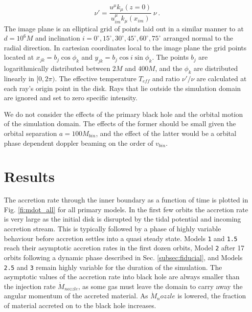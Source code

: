 \documentclass{emulateapj}
\newcommand{\model}[1]{{Model \texttt{#1}}}
\begin{document}
\begin{equation}
	\nu' = \frac{u^\mu k_\mu(z=0)}{u^\mu_{im} k_\mu(x_{im})} \ \nu \ .
\end{equation}
The image plane is an elliptical grid of points laid out in a similar manner to \cite{Kulkarni11} at $d=10^6M$ and inclination $i = 0^\circ, 15^\circ, 30^\circ, 45^\circ, 60^\circ, 75^\circ$ arranged normal to the radial direction.  In cartesian coordinates local to the image plane the grid points located at $x_{jk} = b_j \cos \phi_k$ and $y_{jk} = b_j \cos i \sin \phi_k$.  The points $b_j$ are logarithmically distributed between $2M$ and $400M$, and the  $\phi_k$ are distributed linearly in $[0, 2\pi)$. The effective temperature $T_{eff}$ and ratio $\nu' / \nu$ are calculated at each ray's origin point in the disk.  Rays that lie outside the simulation domain are ignored and set to zero specific intensity.

We do not consider the effects of the primary black hole and the orbital motion of the simulation domain.  The effects of the former should be small given the orbital separation $a = 100M_{bin}$, and the effect of the latter would be a orbital phase dependent doppler beaming on the order of $v_{bin}$.



\section{Results}
\label{sec:results}

The accretion rate through the inner boundary as a function of time is plotted in Fig. \ref{fi:mdot_all} for all primary models.  In the first few orbits the accretion rate is very large as the initial disk is disrupted by the tidal potential and incoming accretion stream.  This is typically followed by a phase of highly variable behaviour before accretion settles into a quasi steady state.  Models \texttt{1} and \texttt{1.5} reach their asymptotic accretion rates in the first dozen orbits, \model{2} after 17 orbits following a dynamic phase described in Sec. \ref{subsec:fiducial}, and Models \texttt{2.5} and \texttt{3} remain highly variable for the duration of the simulation.  The asymptotic values of the accretion rate into black hole are always smaller than the injection rate $\dot{M}_{nozzle}$, as some gas must leave the domain to carry away the angular momentum of the accreted material.  As $\dot{M}_nozzle$ is lowered, the fraction of material accreted on to the black hole increases.
\end{document}
